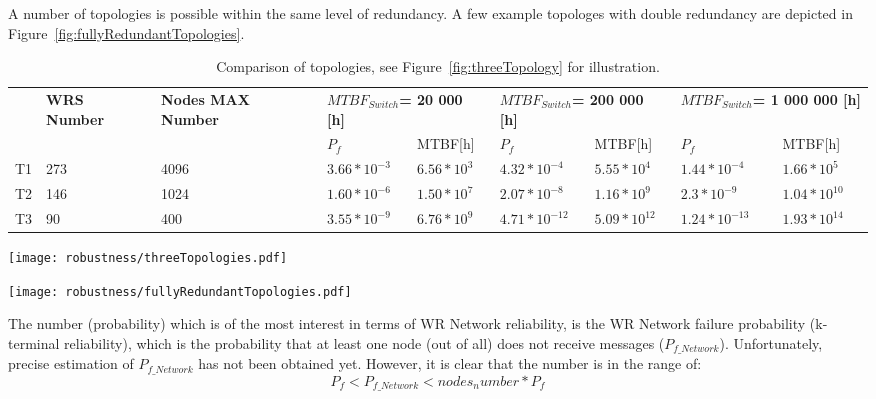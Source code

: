 A number of topologies is possible within the same level of redundancy. A few
example topologes with double redundancy are depicted in
Figure~\ref{fig:fullyRedundantTopologies}.

\begin{table}[ht]
\caption{Comparison of topologies, see Figure~\ref{fig:threeTopology}
for illustration.}
\centering
\begin{tabular}{|p{0.5cm}|p{1cm}|p{1.1cm}|p{1.7cm}|p{1.5cm}|p{1.9cm}|p{1.7cm}
|p{1.9cm}|p{1.7cm}|}        \hline
& \textbf{WRS Number} &
\textbf{Nodes MAX Number} &  
\multicolumn{2}{|p{3cm}|}{\textbf{$MTBF_{Switch}$=    20 000 [h] }} &  
\multicolumn{2}{|p{3cm}|}{\textbf{$MTBF_{Switch}$=   200 000 [h] }} &
\multicolumn{2}{|p{3cm}|}{\textbf{$MTBF_{Switch}$= 1 000 000 [h] }}\\
 & & & $P_f$ & MTBF[h] & $P_f$ & MTBF[h] &
$P_f$   & MTBF[h] \\ \hline

T1 &  273 &  4096  
& $ 3.66*10^{-3}$  & $ 6.56*10^{3}$
& $4.32*10^{-4}$  &  $ 5.55*10^{4}$    
& $1.44*10^{-4}$  &  $ 1.66*10^{5}$  \\ \hline

T2 &  146 &  1024  
& $ 1.60*10^{-6}$  &  $ 1.50*10^{7}$
& $ 2.07*10^{-8}$  &  $ 1.16*10^{9}$    
& $ 2.3*10^{-9}$   &  $ 1.04*10^{10}$   \\ \hline

T3 &  90  &  400   
& $ 3.55*10^{-9}$  &  $ 6.76*10^{9}$
& $ 4.71*10^{-12}$ &  $ 5.09*10^{12}$    
& $ 1.24*10^{-13}$ &  $ 1.93*10^{14}$  \\ \hline
\end{tabular}
\label{tab:nonRedundantTopology}
\end{table}


\begin{center}
	\texttt{[image: robustness/threeTopologies.pdf]}
	\label{fig:threeTopology}
\end{center}

\begin{center}
	\texttt{[image: robustness/fullyRedundantTopologies.pdf]}
	\label{fig:fullyRedundantTopologies}
\end{center}

The number (probability) which is of the most interest in terms of WR Network
reliability, is the WR Network failure probability (k-terminal reliability),
which is the probability that at least one node (out of all) does not receive
messages ($P_{f\_Network}$). Unfortunately, precise estimation of
$P_{f\_Network}$ has not been obtained yet. However, it is clear that the number
is in the range of:
\begin{equation}
       P_f < P_{f\_Network} < nodes_number * P_f
\end{equation}

